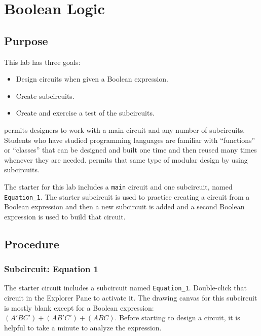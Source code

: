 \chapter{Boolean Logic}\label{bool}

\section{Purpose}

This lab has three goals: 

\begin{itemize}
	\item Design circuits when given a Boolean expression.
	\item Create subcircuits.
	\item Create and exercise a test of the subcircuits.
\end{itemize}

\LE permits designers to work with a main circuit and any number of subcircuits. Students who have studied programming languages are familiar with ``functions'' or ``classes'' that can be designed and built one time and then reused many times whenever they are needed. \LE permits that same type of modular design by using subcircuits. 

The \LE starter for this lab includes a \lstinline[columns=fixed]|main| circuit and one subcircuit, named \lstinline[columns=fixed]|Equation_1|. The starter subcircuit is used to practice creating a circuit from a Boolean expression and then a new subcircuit is added and a second Boolean expression is used to build that circuit.

\section{Procedure}

\subsection{Subcircuit: Equation 1}

The starter circuit includes a subcircuit named \lstinline[columns=fixed]|Equation_1|. Double-click that circuit in the Explorer Pane to activate it. The drawing canvas for this subcircuit is mostly blank except for a Boolean expression: $ (A'BC')+(AB'C')+(ABC) $. Before starting to design a circuit, it is helpful to take a minute to analyze the expression. 

